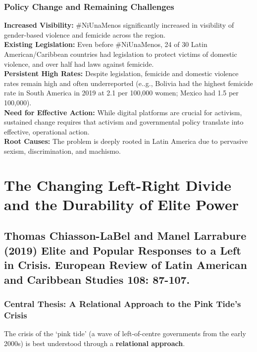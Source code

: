\documentclass{article}
\begin{document}
    \subsubsection{Policy Change and Remaining Challenges}

    \noindent \textbf{Increased Visibility:} \#NiUnaMenos significantly
increased in visibility of gender-based violence and femicide across the
region.\\

    \noindent \textbf{Existing Legislation:} Even before \#NiUnaMenos, 24 of
30 Latin American/Caribbean countries had legislation to protect victims of
domestic violence, and over half had laws against femicide.\\

    \noindent \textbf{Persistent High Rates:} Despite legislation, femicide
and domestic violence rates remain high and often underreported (e..g.,
Bolivia had the highest femicide rate in South America in 2019 at 2.1 per
100,000 women; Mexico had 1.5 per 100,000).\\

    \noindent \textbf{Need for Effective Action:} While digital platforms
are crucial for activism, sustained change requires that activism and
governmental policy translate into effective, operational action.\\

    \noindent \textbf{Root Causes:} The problem is deeply rooted in Latin
America due to pervasive sexism, discrimination, and machismo.


\section{The Changing Left-Right Divide and the Durability of Elite Power}

    \subsection{Thomas Chiasson-LaBel and Manel Larrabure (2019) Elite and
Popular Responses to a Left in Crisis. European Review of Latin American and Caribbean Studies 108: 87-107.}

    \subsubsection{Central Thesis: A Relational Approach to the Pink Tide's Crisis}

    \noindent The crisis of the `pink tide' (a wave of left-of-centre
governments from the early 2000s) is best understood through a
\textbf{relational approach}.\\
\end{document}

